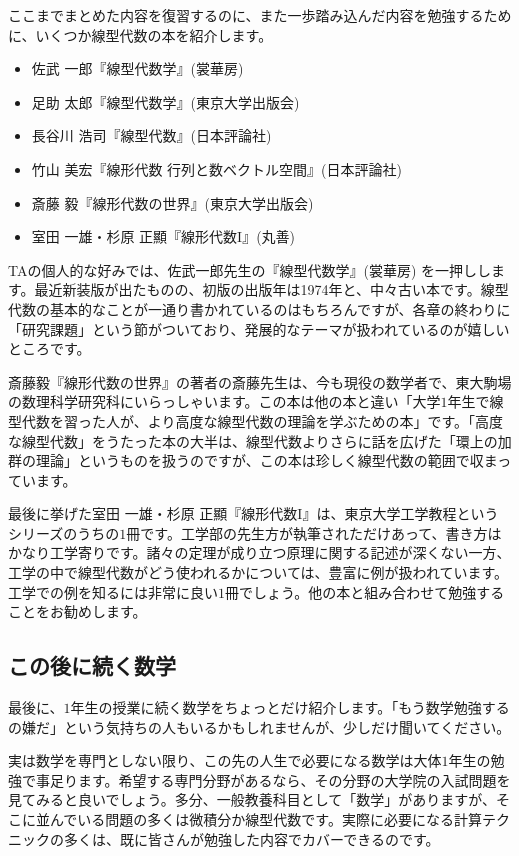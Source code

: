 ここまでまとめた内容を復習するのに、また一歩踏み込んだ内容を勉強するために、いくつか線型代数の本を紹介します。

\begin{itemize}
\item 佐武 一郎『線型代数学』(裳華房)
\item 足助 太郎『線型代数学』(東京大学出版会)
\item 長谷川 浩司『線型代数』(日本評論社)
\item 竹山 美宏『線形代数 行列と数ベクトル空間』(日本評論社)
\item 斎藤 毅『線形代数の世界』(東京大学出版会)
\item 室田 一雄・杉原 正顯『線形代数I』(丸善)
\end{itemize}

TAの個人的な好みでは、佐武一郎先生の『線型代数学』(裳華房) を一押しします。最近新装版が出たものの、初版の出版年は1974年と、中々古い本です。線型代数の基本的なことが一通り書かれているのはもちろんですが、各章の終わりに「研究課題」という節がついており、発展的なテーマが扱われているのが嬉しいところです。

斎藤毅『線形代数の世界』の著者の斎藤先生は、今も現役の数学者で、東大駒場の数理科学研究科にいらっしゃいます。この本は他の本と違い「大学$1$年生で線型代数を習った人が、より高度な線型代数の理論を学ぶための本」です。「高度な線型代数」をうたった本の大半は、線型代数よりさらに話を広げた「環上の加群の理論」というものを扱うのですが、この本は珍しく線型代数の範囲で収まっています。

最後に挙げた室田 一雄・杉原 正顯『線形代数I』は、東京大学工学教程というシリーズのうちの$1$冊です。工学部の先生方が執筆されただけあって、書き方はかなり工学寄りです。諸々の定理が成り立つ原理に関する記述が深くない一方、工学の中で線型代数がどう使われるかについては、豊富に例が扱われています。工学での例を知るには非常に良い$1$冊でしょう。他の本と組み合わせて勉強することをお勧めします。

\subsection{この後に続く数学}

最後に、$1$年生の授業に続く数学をちょっとだけ紹介します。「もう数学勉強するの嫌だ」という気持ちの人もいるかもしれませんが、少しだけ聞いてください。

実は数学を専門としない限り、この先の人生で必要になる数学は大体$1$年生の勉強で事足ります。希望する専門分野があるなら、その分野の大学院の入試問題を見てみると良いでしょう。多分、一般教養科目として「数学」がありますが、そこに並んでいる問題の多くは微積分か線型代数です。実際に必要になる計算テクニックの多くは、既に皆さんが勉強した内容でカバーできるのです。

